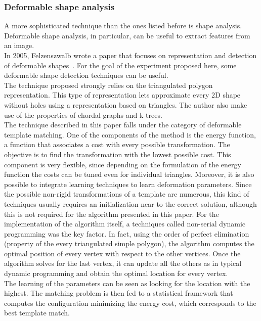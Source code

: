 \documentclass[conference]{IEEEtran}
\begin{document}
			\subsubsection{Deformable shape analysis}
		
				A more sophisticated technique than the ones listed before is shape analysis. Deformable shape analysis, in particular, can be useful to extract features from an image.\\
				In 2005, Felzenszwalb wrote a paper that focuses on representation and detection of deformable shapes~\cite{felzenszwalb2005representation}. For the goal of the experiment proposed here, some deformable shape 
				detection techniques can be useful. \\
				The technique proposed strongly relies on the triangulated polygon representation. This type of representation lets approximate every 2D shape without holes using a representation based on triangles. 
				The author also make use of the properties of chordal graphs and k-trees.\\
				The technique described in this paper falls under the category of deformable template matching. One of the components of the method is the energy function, a function that associates a cost with every 
				possible transformation. The objective is to find the transformation with the lowest possible cost. This component is very flexible, since depending on the formulation of the energy function the costs 
				can be tuned even for individual triangles. Moreover, it is also possible to integrate learning techniques to learn deformation parameters.
				Since the possible non-rigid transformations of a template are numerous, this kind of techniques usually requires an initialization near to the correct solution, 
				although this is not required for the algorithm presented in this paper. 
				For the implementation of the algorithm itself, a techniques called non-serial dynamic programming was the key factor. In fact, using the order of perfect elimination (property of the every triangulated 
				simple polygon), the algorithm computes the optimal position of every vertex with respect to the other vertices. Once the algorithm solves for the last vertex, it can 
				update all the others as in typical dynamic programming and obtain the optimal location for every vertex.\\
				The learning of the parameters can be seen as looking for the location with the highest. The matching problem is then fed to a statistical framework that computes the configuration minimizing the 
				energy cost, which corresponds to the best template match.
				
\end{document}
